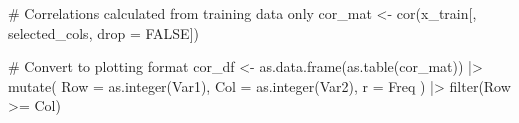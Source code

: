 \documentclass[
  letterpaper,
  DIV=11,
  numbers=noendperiod]{scrreprt}
\newenvironment{Shaded}{\begin{snugshade}}{\end{snugshade}}
\newcommand{\AttributeTok}[1]{\textcolor[rgb]{0.40,0.45,0.13}{#1}}
\newcommand{\CommentTok}[1]{\textcolor[rgb]{0.37,0.37,0.37}{#1}}
\newcommand{\ConstantTok}[1]{\textcolor[rgb]{0.56,0.35,0.01}{#1}}
\newcommand{\FunctionTok}[1]{\textcolor[rgb]{0.28,0.35,0.67}{#1}}
\newcommand{\NormalTok}[1]{\textcolor[rgb]{0.00,0.23,0.31}{#1}}
\newcommand{\OtherTok}[1]{\textcolor[rgb]{0.00,0.23,0.31}{#1}}
\newcommand{\SpecialCharTok}[1]{\textcolor[rgb]{0.37,0.37,0.37}{#1}}
\begin{document}
\begin{Shaded}
\begin{Highlighting}[]
\CommentTok{\# Correlations calculated from training data only}
\NormalTok{cor\_mat }\OtherTok{\textless{}{-}} \FunctionTok{cor}\NormalTok{(x\_train[, selected\_cols, }\AttributeTok{drop =} \ConstantTok{FALSE}\NormalTok{])}

\CommentTok{\# Convert to plotting format}
\NormalTok{cor\_df }\OtherTok{\textless{}{-}} \FunctionTok{as.data.frame}\NormalTok{(}\FunctionTok{as.table}\NormalTok{(cor\_mat)) }\SpecialCharTok{|\textgreater{}}
  \FunctionTok{mutate}\NormalTok{(}
    \AttributeTok{Row =} \FunctionTok{as.integer}\NormalTok{(Var1),}
    \AttributeTok{Col =} \FunctionTok{as.integer}\NormalTok{(Var2),}
    \AttributeTok{r =}\NormalTok{ Freq}
\NormalTok{  ) }\SpecialCharTok{|\textgreater{}}
  \FunctionTok{filter}\NormalTok{(Row }\SpecialCharTok{\textgreater{}=}\NormalTok{ Col)}


\end{Highlighting}
\end{Shaded}
\end{document}
